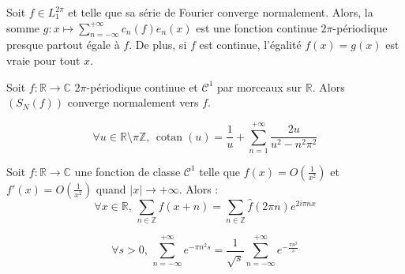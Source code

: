 
  \begin{proposition}
    Soit $f \in L_1^{2\pi}$ et telle que sa série de Fourier converge normalement. Alors, la somme $g : x \mapsto \sum_{n=-\infty}^{+\infty} c_n(f) e_n(x)$ est une fonction continue $2\pi$-périodique presque partout égale à $f$. De plus, si $f$ est continue, l'égalité $f(x) = g(x)$ est vraie pour tout $x$.
  \end{proposition}

  \begin{proposition}
    Soit $f : \mathbb{R} \rightarrow \mathbb{C}$ $2\pi$-périodique continue et $\mathcal{C}^1$ par morceaux sur $\mathbb{R}$. Alors $(S_N(f))$ converge normalement vers $f$.
  \end{proposition}


  \begin{application}
    \[ \forall u \in \mathbb{R} \setminus \pi \mathbb{Z}, \, \operatorname{cotan}(u) = \frac{1}{u} + \sum_{n=1}^{+\infty} \frac{2u}{u^2 - n^2 \pi^2} \]
  \end{application}


  \begin{theorem}
    Soit $f : \mathbb{R} \rightarrow \mathbb{C}$ une fonction de classe $\mathcal{C}^1$ telle que $f(x) = O \left( \frac{1}{x^2} \right)$ et $f'(x) = O \left( \frac{1}{x^2} \right)$ quand $|x| \longrightarrow +\infty$. Alors :
    \[ \forall x \in \mathbb{R}, \, \sum_{n \in \mathbb{Z}} f(x+n) = \sum_{n \in \mathbb{Z}} \widehat{f}(2 \pi n) e^{2 i \pi n x} \]
  \end{theorem}

  \begin{application}
    \[ \forall s > 0, \, \sum_{n=-\infty}^{+\infty} e^{-\pi n^2 s} = \frac{1}{\sqrt{s}} \sum_{n=-\infty}^{+\infty} e^{-\frac{\pi n^2}{s}} \]
  \end{application}

